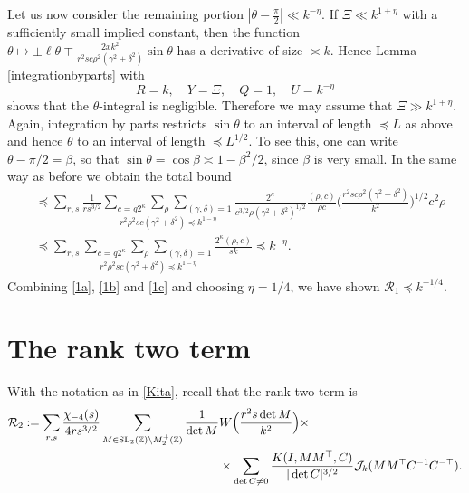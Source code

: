\documentclass[11pt]{amsart}
\numberwithin{equation}{section}
\theoremstyle{plain}
\theoremstyle{definition}
\numberwithin{equation}{section}
\begin{document}
Let us now consider the remaining portion $|\theta - \frac{\pi}{2}| \ll k^{-\eta}$. If $\Xi \ll k^{1+\eta}$ with a sufficiently small implied constant, then the function $\theta \mapsto \pm \ell \theta \mp \frac{2 x  k^2 }{r^2 sc\rho^2(\gamma^2 + \delta^2)} \sin\theta$ has a derivative of size $\asymp k$. Hence 
Lemma \ref{integrationbyparts}  with 
$$R = k, \quad Y = \Xi, \quad Q = 1, \quad U = k^{-\eta}$$ 
shows that the $\theta$-integral is negligible. Therefore we may assume that $\Xi \gg k^{1+\eta}$. Again, integration by parts restricts $\sin\theta$ to an interval of length $\preccurlyeq L$ as above and hence $\theta$ to an interval of length $ \preccurlyeq L^{1/2}$. To see this, one can write $\theta- \pi/2=\beta$, so that $\sin \theta = \cos \beta \asymp 1- \beta^2/2$, since $\beta$ is very small. In the same way as before we obtain the total bound
\begin{equation}\label{1c}
\begin{split}
& \preccurlyeq   \sum_{r, s} \frac{1}{rs^{3/2}} \underset{r^2 \rho^2 s c (\gamma^2 + \delta^2) \preccurlyeq k^{1-\eta} }{\sum_{c=q2^{\kappa}} \sum_{\rho}\sum_{(\gamma, \delta) = 1}  }    \frac{2^{\kappa}}{c^{3/2} \rho(\gamma^2 + \delta^2)^{1/2}} \frac{(\rho, c)}{\rho c}\Big( \frac{r^2 s c \rho^2 (\gamma^2 + \delta^2)}{k^2}\Big)^{1/2}  c^2 \rho \\
&\preccurlyeq     \sum_{r, s}   \underset{r^2 \rho^2 s c (\gamma^2 + \delta^2) \preccurlyeq k^{1-\eta} }{\sum_{c=q2^{\kappa}} \sum_{\rho}\sum_{(\gamma, \delta) = 1}  }        \frac{ 2^{\kappa} (\rho, c)}{sk}  \preccurlyeq k^{-\eta}. 
\end{split}
\end{equation}
Combining \eqref{1a}, \eqref{1b} and \eqref{1c} and choosing $\eta = 1/4$, we have shown   $\mathcal{R}_1 \preccurlyeq k^{-1/4}$. 
 
\section{The rank two term}\label{rank2} 

With the notation as in \eqref{Kita}, recall that  the rank two term is
\begin{align}
\mathcal{R}_2 :=   \sum_{r, s} \frac{\chi_{-4}(s)}{4rs^{3/2}} \sum_{M \in {\rm SL}_2(\mathbb{Z}) \backslash M_2^+(\mathbb{Z})} \frac{1}{\det M} & W\Big( \frac{r^2 s \det M}{k^2}\Big) \times \\
& \times \sum_{\det C \not= 0} \frac{K(I, MM^{\top}, C)}{|\det C|^{3/2}} \mathcal{J}_k(MM^{\top} C^{-1} C^{-\top}).
\end{align}
\end{document}
